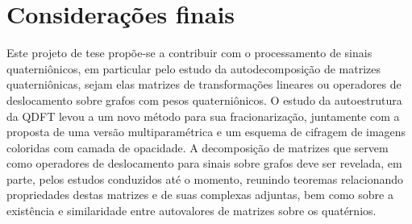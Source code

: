 %
%

\chapter[Considera\c c\~oes finais]{Considera\c c\~oes finais}
\label{ch:others}

Este projeto de tese prop\~oe-se a contribuir com o processamento de sinais quaterni\^onicos, em particular pelo estudo da autodecomposi\c c\~ao de matrizes quaterni\^onicas, sejam elas matrizes de transforma\c c\~oes lineares ou operadores de deslocamento sobre grafos com pesos quaterni\^onicos. O estudo da autoestrutura da QDFT levou a um novo m\'etodo para sua fracionariza\c c\~ao, juntamente com a proposta de uma vers\~ao multiparam\'etrica e um esquema de cifragem de imagens coloridas com camada de opacidade. A decomposi\c c\~ao de matrizes que servem como operadores de deslocamento para sinais sobre grafos deve ser revelada, em parte, pelos estudos conduzidos at\'e o momento, reunindo teoremas relacionando propriedades destas matrizes e de suas complexas adjuntas, bem como sobre a exist\^encia e similaridade entre autovalores de matrizes sobre os quat\'ernios.

